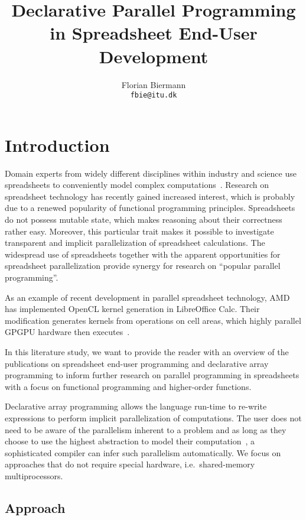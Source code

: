 \documentclass[a4paper]{article}
\title{Declarative Parallel Programming in Spreadsheet End-User
  Development}
\author{Florian Biermann\\\small{\texttt{fbie@itu.dk}}}
\begin{document}
\maketitle

\section{Introduction}
\label{sec:intro}

Domain experts from widely different disciplines within industry and science use spreadsheets to conveniently model complex computations~\cite{Sestoft2014Spreadsheet}. Research on spreadsheet technology has recently gained increased interest, which is probably due to a renewed popularity of functional programming principles. Spreadsheets do not possess mutable state, which makes reasoning about their correctness rather easy. Moreover, this particular trait makes it possible to investigate transparent and implicit parallelization of spreadsheet calculations. The widespread use of spreadsheets together with the apparent opportunities for spreadsheet parallelization provide synergy for research on ``popular parallel programming''.

As an example of recent development in parallel spreadsheet technology, AMD has implemented OpenCL kernel generation in LibreOffice Calc. Their modification generates kernels from operations on cell areas, which highly parallel GPGPU hardware then executes~\cite{Trudeau2015Collaboration}.

In this literature study, we want to provide the reader with an overview of the publications on spreadsheet end-user programming and declarative array programming to inform further research on parallel programming in spreadsheets with a focus on functional programming and higher-order functions.

Declarative array programming allows the language run-time to re-write expressions to perform implicit parallelization of computations. The user does not need to be aware of the parallelism inherent to a problem and as long as they choose to use the highest abstraction to model their computation~\cite{Bernecky:2015:AEP:2774959.2774962}, a sophisticated compiler can infer such parallelism automatically. We focus on approaches that do not require special hardware, i.e.\ shared-memory multiprocessors.

\subsection{Approach}
\label{sec:approach}
\end{document}
